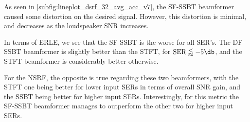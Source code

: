 As seen in \cref{subfig:lineplot_dsrf_32_avg_acc_v7}, the SF-SSBT beamformer caused some distortion on the desired signal. However, this distortion is minimal, and decreases as the loudspeaker SNR increases.

In terms of ERLE, we see that the SF-SSBT is the worse for all SER's. The DF-SSBT beamformer is slightly better than the STFT, for $\text{SER} \lessapprox -5\dB$, and the STFT beamformer is considerably better otherwise.

For the NSRF, the opposite is true regarding these two beamformers, with the STFT one being better for lower input SERs in terms of overall SNR gain, and the SSBT being better for higher input SERs. Interestingly, for this metric the SF-SSBT beamformer manages to outperform the other two for higher input SERs.